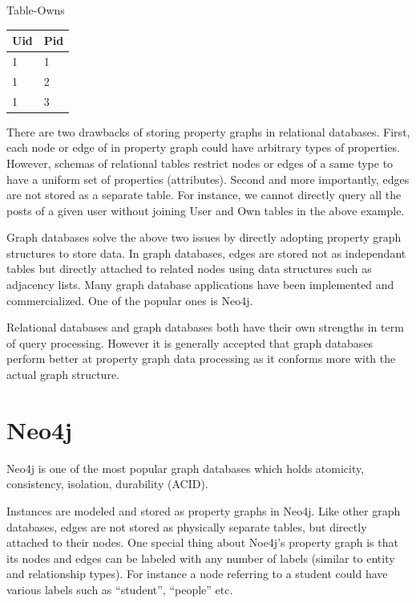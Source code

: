 Table-Owns
\begin{center}
	\begin{tabular}{ l | l }  
		Uid	& Pid	\\ \hline 
		1	&1 \\
		1	&2 \\
		1	&3 \\
	\end{tabular}
	\end {center}

 
There are two drawbacks of storing property graphs in relational databases. First, each node or edge of in property graph could have arbitrary types of properties. However, schemas of relational tables restrict nodes or edges of a same type to have a uniform set of properties (attributes). Second and more importantly, edges are not stored as a separate table. For instance, we cannot directly query all the posts of a given user without joining User and Own tables in the above example.
 
Graph databases solve the above two issues by directly adopting property graph structures to store data. In graph databases, edges are stored not as independant tables but directly attached to related nodes using data structures such as adjacency lists. Many graph database applications have been implemented and commercialized. One of the popular ones is Neo4j.
 
Relational databases and graph databases both have their own strengths in term of query processing. However it is generally accepted that graph databases perform better at property graph data processing as it conforms more with the actual graph structure. 

\section{Neo4j}
Neo4j is one of the most popular graph databases which holds atomicity, consistency, isolation, durability (ACID). 
 
Instances are modeled and stored as  property graphs in Neo4j. Like other graph databases, edges are not stored as physically separate tables, but directly attached to their nodes. One special thing about Noe4j’s property graph is that its nodes and edges can be labeled with any number of labels (similar to entity and relationship types). For instance a node referring to a student could have various labels such as “student”, “people” etc. 

